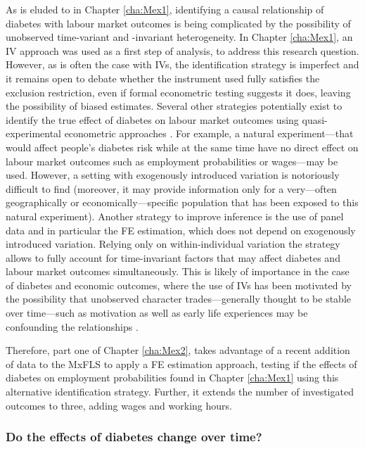 As is eluded to in Chapter \ref{cha:Mex1}, identifying a causal relationship of diabetes with labour market outcomes is being complicated by the possibility of unobserved time-variant and -invariant heterogeneity. In Chapter \ref{cha:Mex1}, an \ac{IV} approach was used as a first step of analysis, to address this research question. However, as is often the case with \acp{IV}, the identification strategy is imperfect and it remains open to debate whether the instrument used fully satisfies the exclusion restriction, even if formal econometric testing suggests it does, leaving the possibility of biased estimates. Several other strategies potentially exist to identify the true effect of diabetes on labour market outcomes using quasi-experimental econometric approaches \parencite{Antonakis2012}. For example, a natural experiment---that would affect people's diabetes risk while at the same time have no direct effect on labour market outcomes such as employment probabilities or wages---may be used. However, a setting with exogenously introduced variation is notoriously difficult to find (moreover, it  may provide information only for a very---often geographically or economically---specific population that has been exposed to this natural experiment). Another strategy to improve inference is the use of panel data and in particular the \ac{FE} estimation, which does not depend on exogenously introduced variation. Relying only on within-individual variation the strategy allows to fully account for time-invariant factors that may affect diabetes and labour market outcomes simultaneously. This is likely of importance in the case of diabetes and economic outcomes, where the use of \ac{IV}s has been motivated by the possibility that unobserved character trades---generally thought to be stable over time---such as motivation as well as early life experiences may be confounding the relationships \parencite{Seuring2015}.

Therefore, part one of Chapter \ref{cha:Mex2}, takes advantage of a recent addition of data to the \ac{MxFLS} to apply a \ac{FE} estimation approach, testing if the effects of diabetes on employment probabilities found in Chapter \ref{cha:Mex1} using this alternative identification strategy. Further, it extends the number of investigated outcomes to three, adding wages and working hours.

\subsubsection{Do the effects of diabetes change over time?}

